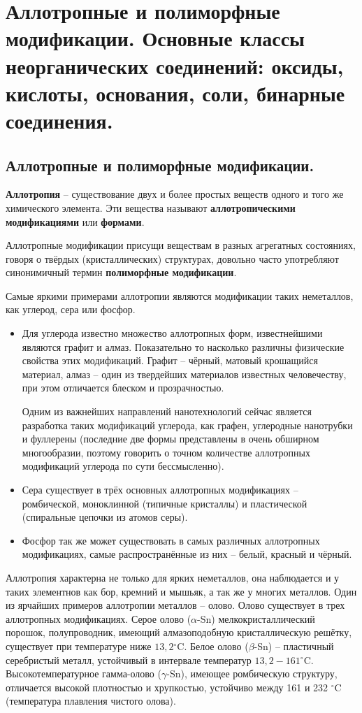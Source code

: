 \section{Аллотропные и полиморфные модификации. Основные классы неорганических соединений: оксиды, кислоты, основания, соли, бинарные соединения.}
\subsection{Аллотропные и полиморфные модификации.}
\textbf{Аллотропия} -- существование двух и более простых веществ одного и того же химического элемента. Эти вещества называют \textbf{аллотропическими модификациями} или \textbf{формами}.

Аллотропные модификации присущи веществам в разных агрегатных состояниях, говоря о твёрдых (кристаллических) структурах, довольно часто употребляют синонимичный термин \textbf{полиморфные модификации}.

Самые яркими примерами аллотропии являются модификации таких неметаллов, как углерод, сера или фосфор. 
\begin{itemize}
    \item Для углерода известно множество аллотропных форм, известнейшими являются графит и алмаз. Показательно то насколько различны физические свойства этих модификаций. Графит -- чёрный, матовый крошащийся материал, алмаз -- один из твердейших материалов известных человечеству, при этом отличается блеском и прозрачностью.
    
    Одним из важнейших направлений нанотехнологий сейчас является разработка таких модификаций углерода, как графен, углеродные нанотрубки и фуллерены (последние две формы представлены в очень обширном многообразии, поэтому говорить о точном количестве аллотропных модификаций углерода по сути бессмысленно).
    \item Сера существует в трёх основных аллотропных модификациях -- ромбической, моноклинной (типичные кристаллы) и пластической (спиральные цепочки из атомов серы).
    \item Фосфор так же может существовать в самых различных аллотропных модификациях, самые распространённые из них -- белый, красный и чёрный.
\end{itemize}
Аллотропия характерна не только для ярких неметаллов, она наблюдается и у таких элементнов как бор, кремний и мышьяк, а так же у многих металлов. Один из ярчайших примеров аллотропии металлов -- олово. Олово существует в трех аллотропных модификациях. Серое олово ($\alpha$-Sn) мелкокристаллический порошок, полупроводник, имеющий алмазоподобную кристаллическую решётку, существует при температуре ниже $13,2 {}^{\circ}\mathrm{C}$. Белое олово ($\beta$-Sn) -- пластичный серебристый металл, устойчивый в интервале температур $13,2 - 161 {}^{\circ}\mathrm{C}$. Высокотемпературное гамма-олово ($\gamma$-Sn), имеющее ромбическую структуру, отличается высокой плотностью и хрупкостью, устойчиво между 161 и 232 ${}^{\circ}\mathrm{C}$ (температура плавления чистого олова). 

